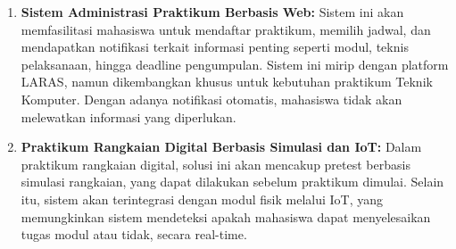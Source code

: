 \begin{enumerate}
\item \textbf{Sistem Administrasi Praktikum Berbasis Web:} Sistem ini akan memfasilitasi mahasiswa untuk mendaftar praktikum, memilih jadwal, dan mendapatkan notifikasi terkait informasi penting seperti modul, teknis pelaksanaan, hingga deadline pengumpulan. Sistem ini mirip dengan platform LARAS, namun dikembangkan khusus untuk kebutuhan praktikum Teknik Komputer. Dengan adanya notifikasi otomatis, mahasiswa tidak akan melewatkan informasi yang diperlukan.

\item \textbf{Praktikum Rangkaian Digital Berbasis Simulasi dan IoT:} Dalam praktikum rangkaian digital, solusi ini akan mencakup pretest berbasis simulasi rangkaian, yang dapat dilakukan sebelum praktikum dimulai. Selain itu, sistem akan terintegrasi dengan modul fisik melalui IoT, yang memungkinkan sistem mendeteksi apakah mahasiswa dapat menyelesaikan tugas modul atau tidak, secara real-time.
\end{enumerate}
